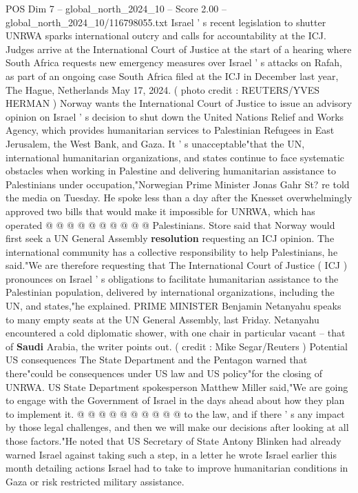 \begin{textsample}{POS Dim 7 – global\_north\_2024\_10 – Score 2.00 – global\_north\_2024\_10/116798055.txt}  \label{ex:f7_pos_414}
Israel ' s recent legislation to shutter UNRWA sparks international outcry and calls for accountability at the ICJ.
Judges arrive at the International Court of Justice at the start of a hearing where South Africa requests new emergency measures over Israel ' s attacks on Rafah, as part of an ongoing case South Africa filed at the ICJ in December last year, The Hague, Netherlands May 17, 2024. ( photo credit : REUTERS/YVES HERMAN ) Norway wants the International Court of Justice to issue an advisory opinion on Israel ' s decision to shut down the United Nations Relief and Works Agency, which provides humanitarian services to Palestinian Refugees in East Jerusalem, the West Bank, and Gaza.
It ' s unacceptable"that the UN, international humanitarian organizations, and states continue to face systematic obstacles when working in Palestine and delivering humanitarian assistance to Palestinians under occupation,"Norwegian Prime Minister Jonas Gahr St? re told the media on Tuesday.
He spoke less than a day after the Knesset overwhelmingly approved two bills that would make it impossible for UNRWA, which has operated @ @ @ @ @ @ @ @ @ @ Palestinians.
Store said that Norway would first seek a UN General Assembly \textbf{resolution} requesting an ICJ opinion.
The international community has a collective responsibility to help Palestinians, he said."We are therefore requesting that The International Court of Justice ( ICJ ) pronounces on Israel ' s obligations to facilitate humanitarian assistance to the Palestinian population, delivered by international organizations, including the UN, and states,"he explained.
PRIME MINISTER Benjamin Netanyahu speaks to many empty seats at the UN General Assembly, last Friday.
Netanyahu encountered a cold diplomatic shower, with one chair in particular vacant -- that of \textbf{Saudi} Arabia, the writer points out. ( credit : Mike Segar/Reuters ) Potential US consequences The State Department and the Pentagon warned that there"could be consequences under US law and US policy"for the closing of UNRWA.
US State Department spokesperson Matthew Miller said,"We are going to engage with the Government of Israel in the days ahead about how they plan to implement it. @ @ @ @ @ @ @ @ @ @ to the law, and if there ' s any impact by those legal challenges, and then we will make our decisions after looking at all those factors."He noted that US Secretary of State Antony Blinken had already warned Israel against taking such a step, in a letter he wrote Israel earlier this month detailing actions Israel had to take to improve humanitarian conditions in Gaza or risk restricted military assistance.

\end{textsample}
